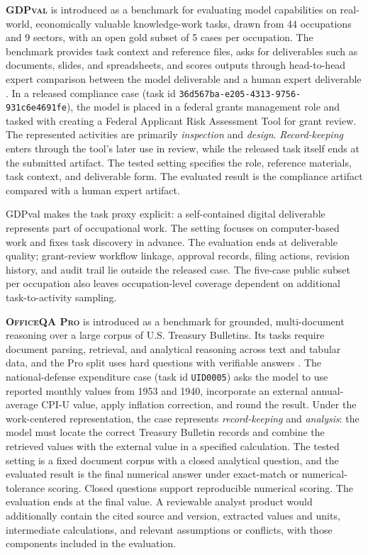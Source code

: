 \documentclass[10pt]{article}
\begin{document}
\textbf{\textsc{GDPval}} is introduced as a benchmark for evaluating model capabilities on real-world, economically valuable knowledge-work tasks, drawn from 44 occupations and 9 sectors, with an open gold subset of 5 cases per occupation. The benchmark provides task context and reference files, asks for deliverables such as documents, slides, and spreadsheets, and scores outputs through head-to-head expert comparison between the model deliverable and a human expert deliverable \citep{gdpval2025}. In a released compliance case (task id \texttt{36d567ba-e205-4313-9756-931c6e4691fe}), the model is placed in a federal grants management role and tasked with creating a Federal Applicant Risk Assessment Tool for grant review. The represented activities are primarily \emph{inspection} and \emph{design}. \emph{Record-keeping} enters through the tool's later use in review, while the released task itself ends at the submitted artifact. The tested setting specifies the role, reference materials, task context, and deliverable form. The evaluated result is the compliance artifact compared with a human expert artifact.

GDPval makes the task proxy explicit: a self-contained digital deliverable represents part of occupational work. The setting focuses on computer-based work and fixes task discovery in advance. The evaluation ends at deliverable quality; grant-review workflow linkage, approval records, filing actions, revision history, and audit trail lie outside the released case. The five-case public subset per occupation also leaves occupation-level coverage dependent on additional task-to-activity sampling.

\textbf{\textsc{OfficeQA Pro}} is introduced as a benchmark for grounded, multi-document reasoning over a large corpus of U.S. Treasury Bulletins. Its tasks require document parsing, retrieval, and analytical reasoning across text and tabular data, and the Pro split uses hard questions with verifiable answers \citep{opsahlong2026officeqapro}. The national-defense expenditure case (task id \texttt{UID0005}) asks the model to use reported monthly values from 1953 and 1940, incorporate an external annual-average CPI-U value, apply inflation correction, and round the result. Under the work-centered representation, the case represents \emph{record-keeping} and \emph{analysis}: the model must locate the correct Treasury Bulletin records and combine the retrieved values with the external value in a specified calculation. The tested setting is a fixed document corpus with a closed analytical question, and the evaluated result is the final numerical answer under exact-match or numerical-tolerance scoring. Closed questions support reproducible numerical scoring. The evaluation ends at the final value. A reviewable analyst product would additionally contain the cited source and version, extracted values and units, intermediate calculations, and relevant assumptions or conflicts, with those components included in the evaluation.
\end{document}
